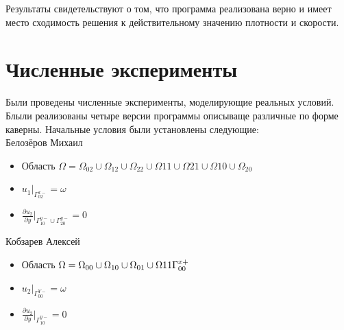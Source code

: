 \documentclass[a4paper, 25pt]{article}
\begin{document}
Результаты свидетельствуют о том, что программа реализована верно и имеет место сходимость решения к действительному значению плотности и скорости.
\newpage

\section {Численные эксперименты}

Были проведены численные эксперименты, моделирующие реальных условий.
Блыли реализованы четыре версии программы описываще различные по форме каверны.
Начальные условия были установлены следующие:\\
Белозёров Михаил
\begin {itemize}
\item Область $\Omega = \Omega_{02} \cup \Omega_{12} \cup \Omega_{22} \cup \Omega{11} \cup \Omega{21} \cup \Omega{10} \cup \Omega_{20}$
  \item $u_1|_{\Gamma_{02}^{x-}} = \omega$
  \item $\frac{{\partial}u_2}{{\partial}y}|_{\Gamma_{10}^{y-}\cup\Gamma_{20}^{y-}} = 0$
\end   {itemize}
Кобзарев Алексей
\begin {itemize}
\item Область $\Omega = \Omega_{00} \cup \Omega_{10} \cup \Omega_{01} \cup \Omega{11} \\ \Gamma^{x+}_{00}$
  \item $u_2|_{\Gamma_{00}^{Y-}} = \omega$
  \item $\frac{{\partial}u_2}{{\partial}y}|_{\Gamma_{10}^{y-}} = 0$
\end   {itemize}
\end{document}
